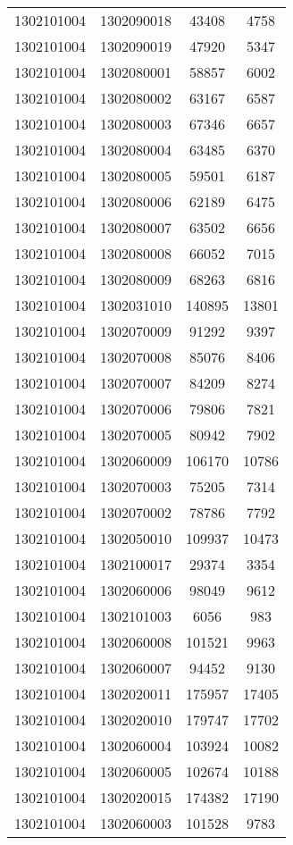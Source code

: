 \begin{longtable}[h]{llcc}
		1302101004 & 1302090018 & 43408 & 4758\\
		1302101004 & 1302090019 & 47920 & 5347\\
		1302101004 & 1302080001 & 58857 & 6002\\
		1302101004 & 1302080002 & 63167 & 6587\\
		1302101004 & 1302080003 & 67346 & 6657\\
		1302101004 & 1302080004 & 63485 & 6370\\
		1302101004 & 1302080005 & 59501 & 6187\\
		1302101004 & 1302080006 & 62189 & 6475\\
		1302101004 & 1302080007 & 63502 & 6656\\
		1302101004 & 1302080008 & 66052 & 7015\\
		1302101004 & 1302080009 & 68263 & 6816\\
		1302101004 & 1302031010 & 140895 & 13801\\
		1302101004 & 1302070009 & 91292 & 9397\\
		1302101004 & 1302070008 & 85076 & 8406\\
		1302101004 & 1302070007 & 84209 & 8274\\
		1302101004 & 1302070006 & 79806 & 7821\\
		1302101004 & 1302070005 & 80942 & 7902\\
		1302101004 & 1302060009 & 106170 & 10786\\
		1302101004 & 1302070003 & 75205 & 7314\\
		1302101004 & 1302070002 & 78786 & 7792\\
		1302101004 & 1302050010 & 109937 & 10473\\
		1302101004 & 1302100017 & 29374 & 3354\\
		1302101004 & 1302060006 & 98049 & 9612\\
		1302101004 & 1302101003 & 6056 & 983\\
		1302101004 & 1302060008 & 101521 & 9963\\
		1302101004 & 1302060007 & 94452 & 9130\\
		1302101004 & 1302020011 & 175957 & 17405\\
		1302101004 & 1302020010 & 179747 & 17702\\
		1302101004 & 1302060004 & 103924 & 10082\\
		1302101004 & 1302060005 & 102674 & 10188\\
		1302101004 & 1302020015 & 174382 & 17190\\
		1302101004 & 1302060003 & 101528 & 9783\\

\end{longtable}
